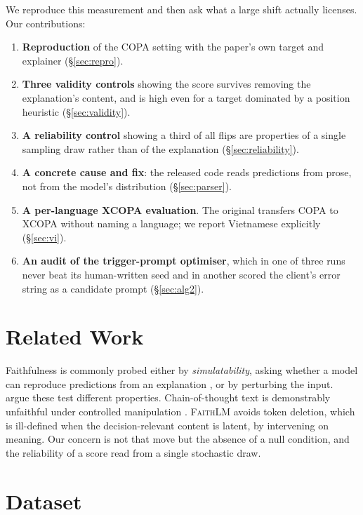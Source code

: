 \documentclass[11pt]{article}
\begin{document}
We reproduce this measurement and then ask what a large shift actually licenses.
Our contributions:

\begin{enumerate}\itemsep0pt
\item \textbf{Reproduction} of the COPA setting with the paper's own target and
  explainer (\S\ref{sec:repro}).
\item \textbf{Three validity controls} showing the score survives removing the
  explanation's content, and is high even for a target dominated by a position
  heuristic (\S\ref{sec:validity}).
\item \textbf{A reliability control} showing a third of all flips are properties
  of a single sampling draw rather than of the explanation
  (\S\ref{sec:reliability}).
\item \textbf{A concrete cause and fix}: the released code reads predictions from
  prose, not from the model's distribution (\S\ref{sec:parser}).
\item \textbf{A per-language XCOPA evaluation}. The original transfers COPA to
  XCOPA without naming a language; we report Vietnamese explicitly
  (\S\ref{sec:vi}).
\item \textbf{An audit of the trigger-prompt optimiser}, which in one of three
  runs never beat its human-written seed and in another scored the client's
  error string as a candidate prompt (\S\ref{sec:alg2}).
\end{enumerate}

\section{Related Work}

Faithfulness is commonly probed either by \emph{simulatability}, asking whether
a model can reproduce predictions from an explanation
\citep{madsen2024selfexp}, or by perturbing the input. \citet{jacovi2020faithfully} argue these test different
properties. Chain-of-thought text is demonstrably unfaithful under controlled
manipulation \citep{turpin2023unfaithful,lanham2023measuring}. \textsc{FaithLM}
avoids token deletion, which is ill-defined when the decision-relevant content is
latent, by intervening on meaning. Our concern is not that move but the absence
of a null condition, and the reliability of a score read from a single stochastic
draw.

\section{Dataset}
\end{document}
